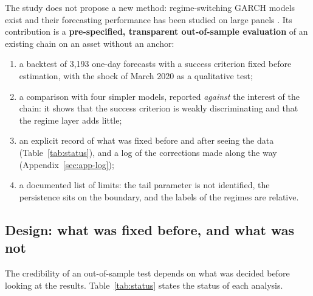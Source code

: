\documentclass[12pt,a4paper]{article}
\begin{document}
\begin{fxbox}[Contributions]
	The study does not propose a new method: regime-switching GARCH models exist \citep{hamiltonsusmel1994,gray1996,haasmittnikpaolella2004} and their forecasting performance has been studied on large panels \citep{ardia2018}. Its contribution is a \textbf{pre-specified, transparent out-of-sample evaluation} of an existing chain on an asset without an anchor:
	\begin{enumerate}
		\item a backtest of 3,193 one-day forecasts with a success criterion fixed before estimation, with the shock of March 2020 as a qualitative test;
		\item a comparison with four simpler models, reported \emph{against} the interest of the chain: it shows that the success criterion is weakly discriminating and that the regime layer adds little;
		\item an explicit record of what was fixed before and after seeing the data (Table~\ref{tab:status}), and a log of the corrections made along the way (Appendix~\ref{sec:app-log});
		\item a documented list of limits: the tail parameter is not identified, the persistence sits on the boundary, and the labels of the regimes are relative.
	\end{enumerate}
\end{fxbox}

\subsection{Design: what was fixed before, and what was not}

The credibility of an out-of-sample test depends on what was decided before looking at the results. Table~\ref{tab:status} states the status of each analysis.
\end{document}
